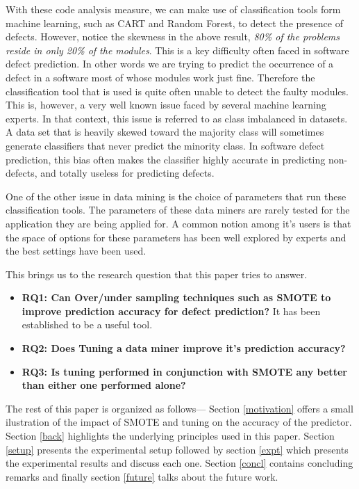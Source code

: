 \documentclass[12pt, journal, compsoc]{IEEEtran}
\begin{document}
With these code analysis measure, we can make use of classification tools form machine learning, such as CART and Random Forest, to detect the presence of defects. However, notice the skewness in the above result, \textit{ 80\% of the problems reside in only 20\% of the modules}. This is a key difficulty often faced in software defect prediction. In other words we are trying to predict the occurrence of a defect in a software most of whose modules work just fine. Therefore the classification tool that is used is quite often unable to detect the faulty modules. This is, however, a very well known issue faced by several machine learning experts. In that context, this issue is referred to as class imbalanced in datasets. A data set that is heavily skewed toward the majority class will sometimes generate classifiers that never predict the minority class. In software defect prediction, this bias often makes the classifier highly accurate in predicting non-defects, and totally useless for predicting defects.

One of the other issue in data mining is the choice of parameters that run these classification tools. The parameters of these data miners are rarely tested for the application they are being applied for. A common notion among it's users is that the space of options for these parameters has been well explored by experts and the best settings have been used.

This brings us to the research question that this paper tries to answer.
\begin{itemize}
\item {\bfseries RQ1:  Can Over/under sampling techniques such as SMOTE to improve prediction accuracy for defect prediction?} It has been established to be a useful tool.
\item {\bfseries RQ2: Does Tuning a data miner improve it's prediction accuracy?}
\item {\bfseries RQ3: Is tuning performed in conjunction with SMOTE any better than either one performed alone?}
\end{itemize}



The rest of this paper is organized as follows--- Section \ref*{motivation} offers a small ilustration of the impact of SMOTE and tuning on the accuracy of the predictor. Section \ref*{back} highlights the underlying principles used in this paper. Section \ref{setup} presents the experimental setup followed by section \ref{expt} which presents the experimental results and discuss each one. Section \ref{concl} contains concluding remarks and finally section \ref{future} talks about the future work.
\end{document}
